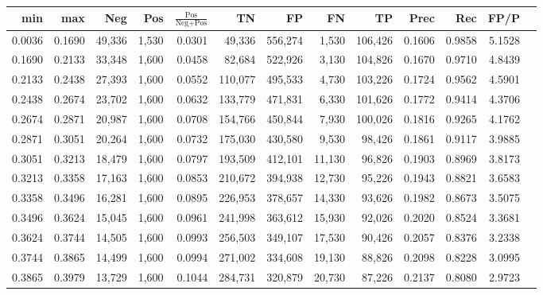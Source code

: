\begin{tabular}{rrrrrrrrrrrrr}
\toprule
   min &    max &    Neg &   Pos & $\frac{\text{Pos}}{\text{Neg}+\text{Pos}}$ &      TN &      FP &      FN &      TP &   Prec &    Rec &   FP/P \\
\midrule
0.0036 & 0.1690 & 49,336 & 1,530 &                                     0.0301 &  49,336 & 556,274 &   1,530 & 106,426 & 0.1606 & 0.9858 & 5.1528 \\
0.1690 & 0.2133 & 33,348 & 1,600 &                                     0.0458 &  82,684 & 522,926 &   3,130 & 104,826 & 0.1670 & 0.9710 & 4.8439 \\
0.2133 & 0.2438 & 27,393 & 1,600 &                                     0.0552 & 110,077 & 495,533 &   4,730 & 103,226 & 0.1724 & 0.9562 & 4.5901 \\
0.2438 & 0.2674 & 23,702 & 1,600 &                                     0.0632 & 133,779 & 471,831 &   6,330 & 101,626 & 0.1772 & 0.9414 & 4.3706 \\
0.2674 & 0.2871 & 20,987 & 1,600 &                                     0.0708 & 154,766 & 450,844 &   7,930 & 100,026 & 0.1816 & 0.9265 & 4.1762 \\
0.2871 & 0.3051 & 20,264 & 1,600 &                                     0.0732 & 175,030 & 430,580 &   9,530 &  98,426 & 0.1861 & 0.9117 & 3.9885 \\
0.3051 & 0.3213 & 18,479 & 1,600 &                                     0.0797 & 193,509 & 412,101 &  11,130 &  96,826 & 0.1903 & 0.8969 & 3.8173 \\
0.3213 & 0.3358 & 17,163 & 1,600 &                                     0.0853 & 210,672 & 394,938 &  12,730 &  95,226 & 0.1943 & 0.8821 & 3.6583 \\
0.3358 & 0.3496 & 16,281 & 1,600 &                                     0.0895 & 226,953 & 378,657 &  14,330 &  93,626 & 0.1982 & 0.8673 & 3.5075 \\
0.3496 & 0.3624 & 15,045 & 1,600 &                                     0.0961 & 241,998 & 363,612 &  15,930 &  92,026 & 0.2020 & 0.8524 & 3.3681 \\
0.3624 & 0.3744 & 14,505 & 1,600 &                                     0.0993 & 256,503 & 349,107 &  17,530 &  90,426 & 0.2057 & 0.8376 & 3.2338 \\
0.3744 & 0.3865 & 14,499 & 1,600 &                                     0.0994 & 271,002 & 334,608 &  19,130 &  88,826 & 0.2098 & 0.8228 & 3.0995 \\
0.3865 & 0.3979 & 13,729 & 1,600 &                                     0.1044 & 284,731 & 320,879 &  20,730 &  87,226 & 0.2137 & 0.8080 & 2.9723 \\

\end{tabular}
